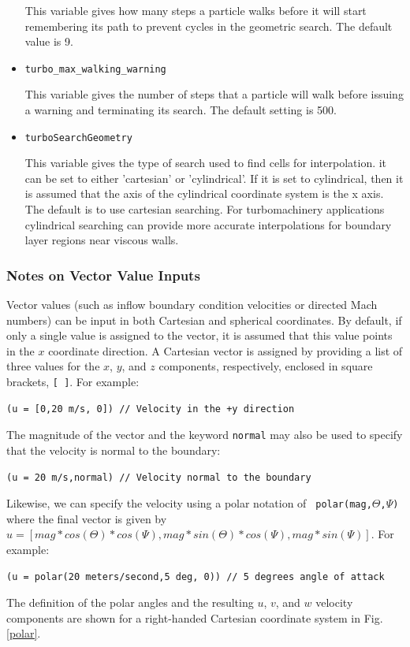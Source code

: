 \documentclass{article}
\begin{document}
\begin{list}{}{}
\begin{itemize}
This variable gives how many steps a particle walks before it will
start remembering its path to prevent cycles in the geometric search.
The default value is 9.

\item {\tt turbo\_max\_walking\_warning}

This variable gives the number of steps that a particle will walk
before issuing a warning and terminating its search.  The default
setting is 500.

\item {\tt turboSearchGeometry}

This variable gives the type of search used to find cells for
interpolation.  it can be set to either 'cartesian' or 'cylindrical'.
If it is set to cylindrical, then it is assumed that the axis of the
cylindrical coordinate system is the x axis.  The default is to use
cartesian searching.  For turbomachinery applications cylindrical
searching can provide more accurate interpolations for boundary layer
regions near viscous walls.

\end{itemize}

\end{list}

\subsubsection{ Notes on Vector Value Inputs }

Vector values (such as inflow boundary condition velocities or directed Mach
numbers) can be input in both Cartesian and spherical coordinates.  By
default, if only a single value is assigned to the vector,
it is assumed that this value points in the $x$ coordinate
direction.  A Cartesian vector is assigned by providing a list of
three values for the $x$, $y$, and $z$ components, respectively, enclosed in square
brackets, {\tt [~]}.  For example:
\begin{verbatim}
(u = [0,20 m/s, 0]) // Velocity in the +y direction
\end{verbatim}
The magnitude of the vector and the keyword {\tt normal} may also
be used to specify that the velocity is normal to the boundary:
\begin{verbatim}
(u = 20 m/s,normal) // Velocity normal to the boundary
\end{verbatim}
Likewise, we can specify the velocity using a polar notation of {\tt
polar(mag,$\Theta$,$\Psi$)} where the final vector is given by $u =
\left[ mag*cos(\Theta)*cos(\Psi),mag*sin(\Theta)*cos(\Psi),mag*sin(\Psi)\right]$.
For example:
\begin{verbatim}
(u = polar(20 meters/second,5 deg, 0)) // 5 degrees angle of attack
\end{verbatim}
The definition of the polar angles and the resulting $u$, $v$, and $w$ velocity components are shown for a right-handed Cartesian coordinate system in Fig. \ref{polar}.
\end{document}
